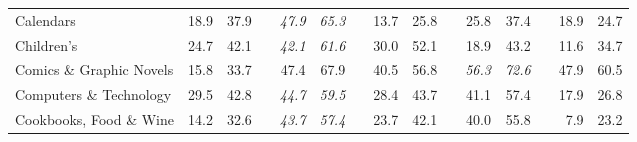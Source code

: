 \documentclass[12pt]{article}
\numberwithin{equation}{section}
\numberwithin{figure}{section}
\begin{document}
\begin{table}[]
{\begin{tabular}{lrrrrrrrrrrrrrr}
	Calendars                      & 18.9                               & 37.9                               &                               & \textit{47.9}                      & \textit{65.3}                      &                               & 13.7                               & 25.8                               &                               & 25.8                               & 37.4                               &                               & 18.9                               & 24.7                               \\
	Children’s                     & 24.7                               & 42.1                               &                               & \textit{42.1}                      & \textit{61.6}                      &                               & 30.0                               & 52.1                               &                               & 18.9                               & 43.2                               &                               & 11.6                               & 34.7                               \\
	Comics \& Graphic Novels       & 15.8                               & 33.7                               &                               & 47.4                               & 67.9                               &                               & 40.5                               & 56.8                               &                               & \textit{56.3}                      & \textit{72.6}                      &                               & 47.9                               & 60.5                               \\
	Computers \& Technology        & 29.5                               & 42.8                               &                               & \textit{44.7}                      & \textit{59.5}                      &                               & 28.4                               & 43.7                               &                               & 41.1                               & 57.4                               &                               & 17.9                               & 26.8                               \\
	Cookbooks, Food \& Wine        & 14.2                               & 32.6                               &                               & \textit{43.7}                      & \textit{57.4}                      &                               & 23.7                               & 42.1                               &                               & 40.0                               & 55.8                               &                               & 7.9                                & 23.2                               \\

\end{tabular}}
\end{table}
\end{document}
